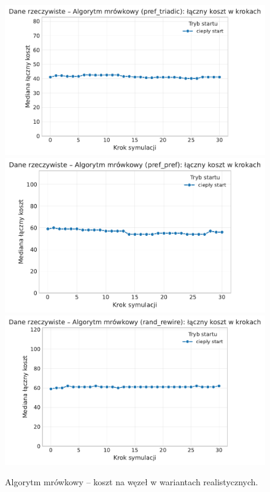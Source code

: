 \begin{figure}[H]
  \centering
  \includegraphics[width=0.62\linewidth]{assets/figures/dynamic/real/real_algorytm_mrowkowy_cost_over_steps_pref_triadic.pdf}\\[0.4em]
  \includegraphics[width=0.62\linewidth]{assets/figures/dynamic/real/real_algorytm_mrowkowy_cost_over_steps_pref_pref.pdf}\\[0.4em]
  \includegraphics[width=0.62\linewidth]{assets/figures/dynamic/real/real_algorytm_mrowkowy_cost_over_steps_rand_rewire.pdf}
  \caption{Algorytm mrówkowy -- koszt na węzeł w wariantach realistycznych.}
  \label{fig:dyn-real-aco-cost}
\end{figure}


